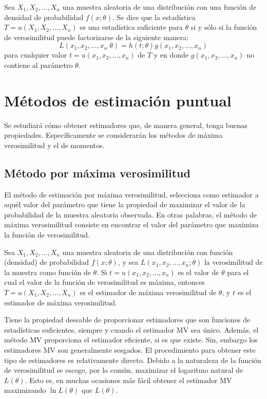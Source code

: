 \begin{teo}
    Sea $X_1,X_2,\ldots,X_n$ una muestra aleatoria de una distribución con una función de densidad de probabilidad $f(x;\theta)$. Se dice que la estadística $T=u(X_1,X_2,\ldots,X_n)$ es una estadística suficiente para $\theta$ si y sólo si la función de verosimilitud  puede factorizarse de la siguiente manera:
    $$L(x_1,x_2,\ldots,x_n\; \theta)=h(t;\theta)g(x_1,x_2,\ldots,x_n)$$
    para cualquier valor $t=u(x_1,x_2,\ldots,x_n)$ de $T$ y en donde $g(x_1,x_2,\ldots,x_n)$ no contiene al parámetro $\theta$.
\end{teo}

\section{Métodos de estimación puntual}

Se estudiará cómo obtener estimadores que, de manera general, tenga buenas propiedades. Específicamente se considerarán los métodos de máxima verosimilitud y el de momentos. 

\subsection{Método por máxima verosimilitud}

El método de estimación por máxima verosimilitud, selecciona como estimador a aquél valor del parámetro que tiene la propiedad de maximizar el valor de la probabilidad de la muestra aleatoria observada. En otras palabras, el método de máxima verosimilitud consiste en encontrar el valor del parámetro que maximiza la función de verosimilitud.

\begin{def.}
    Sea $X_1,X_2,\ldots,X_n$ una muestra aleatoria de una distribución con función (densidad) de probabilidad $f(x;\theta)$, y sea $L(x_1,x_2,\ldots,x_n;\theta)$ la verosimilitud de la muestra como función de $\theta$. Si $t=u(x_1,x_2,\ldots,x_n)$ es el valor de $\theta$ para el cual el valor de la función de verosimilitud es máxima, entonces $T=u(X_1,X_2,\ldots,X_n)$ es el estimador de máxima verosimilitud de $\theta$, y $t$ es el estimador de máxima verosimilitud.
\end{def.}

Tiene la propiedad deseable de proporcionar estimadores que son funciones de estadísticas suficientes, siempre y cuando el estimador MV sea único. Además, el método MV proporciona el estimador eficiente, si es que existe. Sin, embargo los estimadores MV son generalmente sesgados. El procedimiento para obtener este tipo de estimadores es relativamente directo. Debido a la naturaleza de la función de verosimilitud se escoge, por lo común, maximizar el logaritmo natural de $L(\theta)$. Esto es, en muchas ocasiones más fácil obtener el estimador MV maximizando $\ln L(\theta)$ que $L(\theta)$.

